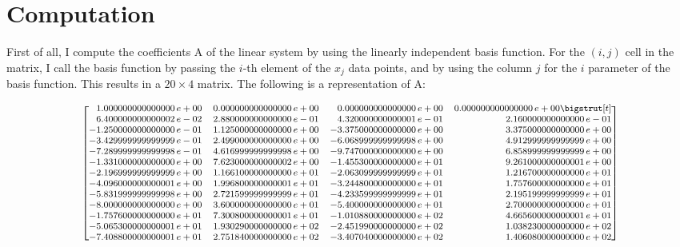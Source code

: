 \documentclass{article}
\begin{document}
\section{Computation}
First of all, I compute the coefficients A of the linear system by using the linearly independent basis function. For the $(i, j)$ cell in the matrix, I call the basis function by passing the $i$-th element of the $x_j$ data points, and by using the column $j$ for the $i$ parameter of the basis function. This results in a $20\times4$ matrix. The following is a representation of A:
\begin{adjustwidth}{-2em}{-2em}
    \[ \medmath{\begin{bmatrix*}[r]
1.000000000000000\,e+00 & 0.000000000000000\,e+00 & 0.000000000000000\,e+00 & 0.000000000000000\,e+00 \bigstrut[t]\\
6.400000000000002\,e-02 & 2.880000000000000\,e-01 & 4.320000000000001\,e-01 & 2.160000000000000\,e-01 \\
-1.250000000000000\,e-01 & 1.125000000000000\,e+00 & -3.375000000000000\,e+00 & 3.375000000000000\,e+00 \\
-3.429999999999999\,e-01 & 2.499000000000000\,e+00 & -6.068999999999998\,e+00 & 4.912999999999999\,e+00 \\
-7.289999999999998\,e-01 & 4.616999999999998\,e+00 & -9.747000000000000\,e+00 & 6.858999999999999\,e+00 \\
-1.331000000000000\,e+00 & 7.623000000000002\,e+00 & -1.455300000000000\,e+01 & 9.261000000000001\,e+00 \\
-2.196999999999999\,e+00 & 1.166100000000000\,e+01 & -2.063099999999999\,e+01 & 1.216700000000000\,e+01 \\
-4.096000000000001\,e+00 & 1.996800000000001\,e+01 & -3.244800000000000\,e+01 & 1.757600000000000\,e+01 \\
-5.831999999999998\,e+00 & 2.721599999999999\,e+01 & -4.233599999999999\,e+01 & 2.195199999999999\,e+01 \\
-8.000000000000000\,e+00 & 3.600000000000000\,e+01 & -5.400000000000000\,e+01 & 2.700000000000000\,e+01 \\
-1.757600000000000\,e+01 & 7.300800000000001\,e+01 & -1.010880000000000\,e+02 & 4.665600000000001\,e+01 \\
-5.065300000000001\,e+01 & 1.930290000000000\,e+02 & -2.451990000000000\,e+02 & 1.038230000000000\,e+02 \\
-7.408800000000001\,e+01 & 2.751840000000000\,e+02 & -3.407040000000000\,e+02 & 1.406080000000000\,e+02 \\

\end{bmatrix*}}\]
\end{adjustwidth}
\end{document}
